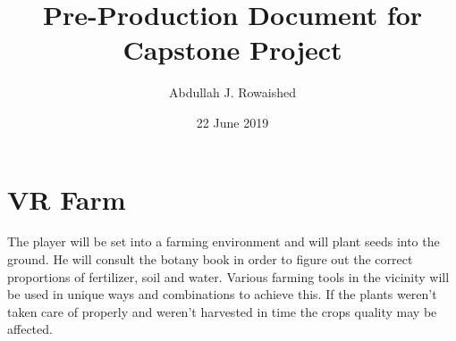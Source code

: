 \documentclass{report}
\title{Pre-Production Document for Capstone Project}
\author{Abdullah J. Rowaished}
\date{22 June 2019}
\begin{document}
\maketitle
\section{VR Farm}
The player will be set into a farming environment and will plant seeds into the ground. He will consult the botany book in order to figure out the correct proportions of fertilizer, soil and water. Various farming tools in the vicinity will be used in unique ways and combinations to achieve this. If the plants weren't taken care of properly and weren't harvested in time the crops quality may be affected.
\end{document}
